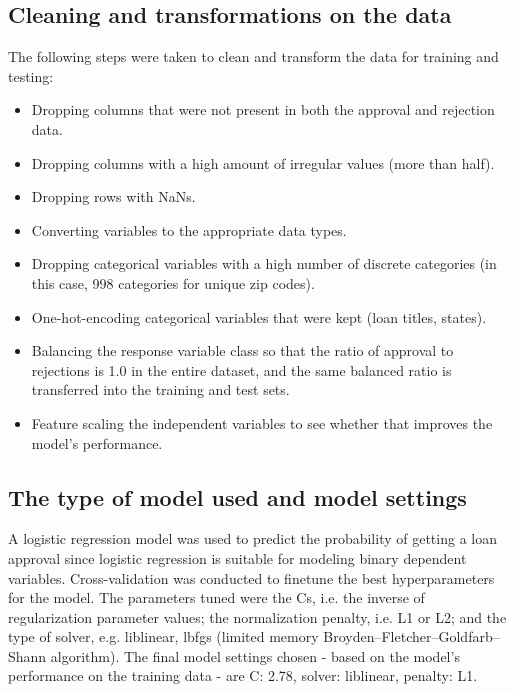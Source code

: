 \documentclass[11pt]{article}
\providecommand{\tightlist}{%
      \setlength{\itemsep}{0pt}\setlength{\parskip}{0pt}}
\begin{document}
    \subsection{Cleaning and transformations on the data}

The following steps were taken to clean and transform the data for
training and testing:

\begin{itemize}
\tightlist
\item
  Dropping columns that were not present in both the approval and
  rejection data.
\item
  Dropping columns with a high amount of irregular values (more than
  half).
\item
  Dropping rows with NaNs.
\item
  Converting variables to the appropriate data types.
\item
  Dropping categorical variables with a high number of discrete
  categories (in this case, 998 categories for unique zip codes).
\item
  One-hot-encoding categorical variables that were kept (loan titles,
  states).
\item
  Balancing the response variable class so that the ratio of approval to
  rejections is 1.0 in the entire dataset, and the same balanced ratio
  is transferred into the training and test sets.
\item
  Feature scaling the independent variables to see whether that improves
  the model's performance.
\end{itemize}

    \subsection{The type of model used and model settings}

A logistic regression model was used to predict the probability of
getting a loan approval since logistic regression is suitable for
modeling binary dependent variables. Cross-validation was conducted to
finetune the best hyperparameters for the model. The parameters tuned
were the Cs, i.e. the inverse of regularization parameter values; the
normalization penalty, i.e. L1 or L2; and the type of solver, e.g.
liblinear, lbfgs (limited memory Broyden--Fletcher--Goldfarb--Shann
algorithm). The final model settings chosen - based on the model's
performance on the training data - are C: 2.78, solver: liblinear,
penalty: L1.\\
\end{document}
